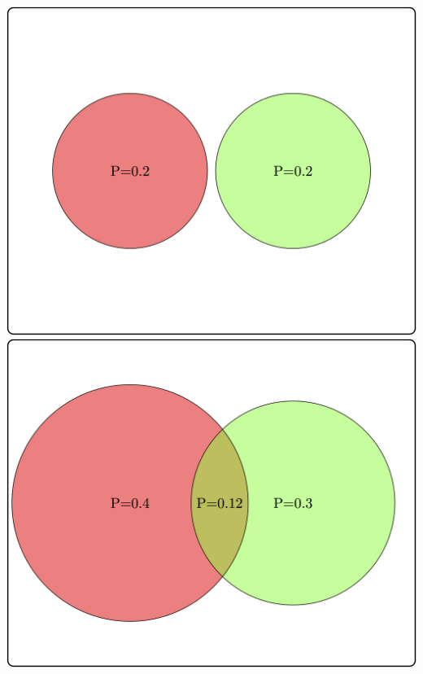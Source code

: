 \documentclass[
  letterpaper,
  DIV=11,
  numbers=noendperiod]{scrreprt}
\begin{document}
\includegraphics{./ch6/indep_ex1.png}
\includegraphics{./ch6/indep_ex2.png}
\end{document}
